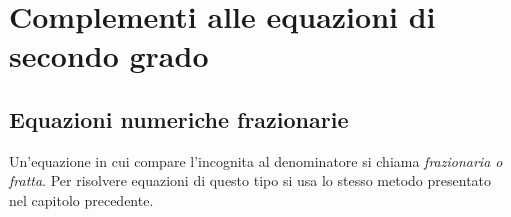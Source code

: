 % 
% 

\section{Complementi alle equazioni di secondo grado}

\subsection{Equazioni numeriche frazionarie}
\label{sec:eq2gr_frazionarie}

Un'equazione in cui compare l'incognita al denominatore si chiama 
\emph{frazionaria o fratta}.
Per risolvere equazioni di questo tipo si usa lo stesso metodo presentato nel 
capitolo precedente.

